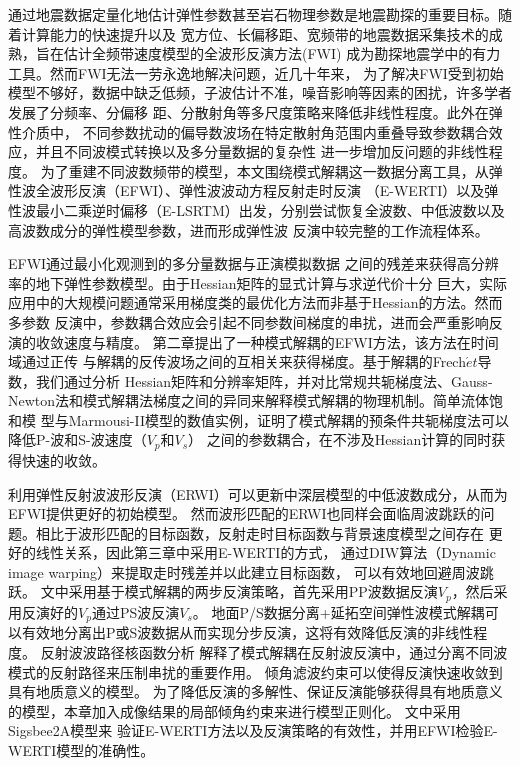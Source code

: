 \begin{cabstract}
	通过地震数据定量化地估计弹性参数甚至岩石物理参数是地震勘探的重要目标。随着计算能力的快速提升以及
	宽方位、长偏移距、宽频带的地震数据采集技术的成熟，旨在估计全频带速度模型的全波形反演方法(FWI)
	成为勘探地震学中的有力工具。然而FWI无法一劳永逸地解决问题，近几十年来，
	为了解决FWI受到初始模型不够好，数据中缺乏低频，子波估计不准，噪音影响等因素的困扰，许多学者发展了分频率、分偏移
	距、分散射角等多尺度策略来降低非线性程度。此外在弹性介质中，
	不同参数扰动的偏导数波场在特定散射角范围内重叠导致参数耦合效应，并且不同波模式转换以及多分量数据的复杂性
	进一步增加反问题的非线性程度。
	为了重建不同波数频带的模型，本文围绕模式解耦这一数据分离工具，从弹性波全波形反演（EFWI）、弹性波波动方程反射走时反演
	（E-WERTI）以及弹性波最小二乘逆时偏移（E-LSRTM）出发，分别尝试恢复全波数、中低波数以及高波数成分的弹性模型参数，进而形成弹性波
	反演中较完整的工作流程体系。

	EFWI通过最小化观测到的多分量数据与正演模拟数据
	之间的残差来获得高分辨率的地下弹性参数模型。由于Hessian矩阵的显式计算与求逆代价十分
	巨大，实际应用中的大规模问题通常采用梯度类的最优化方法而非基于Hessian的方法。然而多参数
	反演中，参数耦合效应会引起不同参数间梯度的串扰，进而会严重影响反演的收敛速度与精度。
	第二章提出了一种模式解耦的EFWI方法，该方法在时间域通过正传
	与解耦的反传波场之间的互相关来获得梯度。基于解耦的Frech$\acute{e}t$导数，我们通过分析
	Hessian矩阵和分辨率矩阵，并对比常规共轭梯度法、Gauss-Newton法和模式解耦法梯度之间的异同来解释模式解耦的物理机制。简单流体饱和模
	型与Marmousi-II模型的数值实例，证明了模式解耦的预条件共轭梯度法可以降低P-波和S-波速度（$V_p$和$V_s$）
	之间的参数耦合，在不涉及Hessian计算的同时获得快速的收敛。

	利用弹性反射波波形反演（ERWI）可以更新中深层模型的中低波数成分，从而为EFWI提供更好的初始模型。
	然而波形匹配的ERWI也同样会面临周波跳跃的问题。相比于波形匹配的目标函数，反射走时目标函数与背景速度模型之间存在
	更好的线性关系，因此第三章中采用E-WERTI的方式，
	通过DIW算法（Dynamic image warping）来提取走时残差并以此建立目标函数，
	可以有效地回避周波跳跃。
	文中采用基于模式解耦的两步反演策略，首先采用PP波数据反演$V_p$，然后采用反演好的$V_p$通过PS波反演$V_s$。
	地面P/S数据分离+延拓空间弹性波模式解耦可以有效地分离出P或S波数据从而实现分步反演，这将有效降低反演的非线性程度。
	反射波波路径核函数分析
	解释了模式解耦在反射波反演中，通过分离不同波模式的反射路径来压制串扰的重要作用。
	倾角滤波约束可以使得反演快速收敛到具有地质意义的模型。
	为了降低反演的多解性、保证反演能够获得具有地质意义的模型，本章加入成像结果的局部倾角约束来进行模型正则化。
	文中采用Sigsbee2A模型来
	验证E-WERTI方法以及反演策略的有效性，并用EFWI检验E-WERTI模型的准确性。


\end{cabstract}
